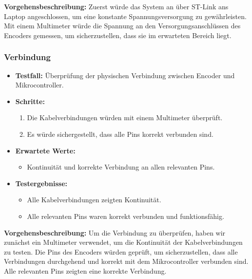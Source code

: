 \textbf{Vorgehensbeschreibung:}
Zuerst würde  das System an über ST-Link ans Laptop angeschlossen, um eine konstante Spannungsversorgung zu gewährleisten. Mit einem Multimeter würde die Spannung an den Versorgungsanschlüssen des Encoders gemessen, um sicherzustellen, dass sie im erwarteten Bereich liegt.

\subsubsection{Verbindung}
\begin{itemize}
    \item \textbf{Testfall:} Überprüfung der physischen Verbindung zwischen Encoder und Mikrocontroller.
    \item \textbf{Schritte:}
    \begin{enumerate}
        \item Die Kabelverbindungen würden mit einem Multimeter überprüft.
        \item Es würde sichergestellt, dass alle Pins korrekt verbunden sind.
    \end{enumerate}
    \item \textbf{Erwartete Werte:}
    \begin{itemize}
        \item Kontinuität und korrekte Verbindung an allen relevanten Pins.
    \end{itemize}
    \item \textbf{Testergebnisse:}
    \begin{itemize}
        \item Alle Kabelverbindungen zeigten Kontinuität.
        \item Alle relevanten Pins waren korrekt verbunden und funktionsfähig.
    \end{itemize}
\end{itemize}


\textbf{Vorgehensbeschreibung:}
Um die Verbindung zu überprüfen, haben wir zunächst ein Multimeter verwendet, um die Kontinuität der Kabelverbindungen zu testen. Die Pins des Encoders würden geprüft, um sicherzustellen, dass alle Verbindungen durchgehend und korrekt mit dem Mikrocontroller verbunden sind. Alle relevanten Pins zeigten eine korrekte Verbindung.

